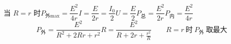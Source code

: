 当 $R=r$ 时\quad $P_{\text{外}\max}=\dfrac{E^2}{4r}$\quad $I=\dfrac{E}{2r}=\dfrac{I_0}{2}$\quad $U=\dfrac{E}{2}$\quad $P_{\text{总}}=\dfrac{E^2}{2r}$\quad $P_{\text{内}}=\dfrac{E^2}{4r}$
\[
P_{\text{外}}=\frac{E^2}{R^2+2Rr+r^2}R=\frac{E^2}{R+2r+\frac{r^2}{R}}\qquad R=r\ \text{时}\ P_{\text{外}}\ \text{取最大}
\]

